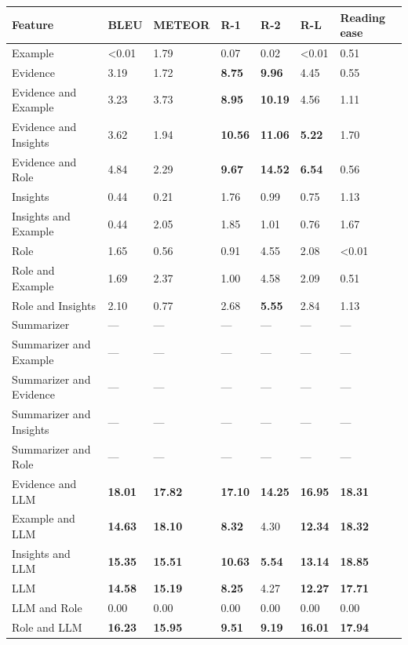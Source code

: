 \begin{tabular}{|l|l|l|l|l|l|l|}
\hline
\textbf{Feature} & BLEU & METEOR & R-1 & R-2 & R-L & Reading ease \\
 \hline
 Example & \textless{}0.01 & 1.79 & 0.07 & 0.02 & \textless{}0.01 & 0.51 \\
 \hline
 Evidence & 3.19 & 1.72 & \textbf{8.75} & \textbf{9.96} & 4.45 & 0.55 \\
 \hline
 Evidence and Example & 3.23 & 3.73 & \textbf{8.95} & \textbf{10.19} & 4.56 & 1.11 \\
 \hline
 Evidence and Insights & 3.62 & 1.94 & \textbf{10.56} & \textbf{11.06} & \textbf{5.22} & 1.70 \\
 \hline
 Evidence and Role & 4.84 & 2.29 & \textbf{9.67} & \textbf{14.52} & \textbf{6.54} & 0.56 \\
 \hline
 Insights & 0.44 & 0.21 & 1.76 & 0.99 & 0.75 & 1.13 \\
 \hline
 Insights and Example & 0.44 & 2.05 & 1.85 & 1.01 & 0.76 & 1.67 \\
 \hline
 Role & 1.65 & 0.56 & 0.91 & 4.55 & 2.08 & \textless{}0.01 \\
 \hline
 Role and Example & 1.69 & 2.37 & 1.00 & 4.58 & 2.09 & 0.51 \\
 \hline
 Role and Insights & 2.10 & 0.77 & 2.68 & \textbf{5.55} & 2.84 & 1.13 \\
 \hline
 Summarizer & — & — & — & — & — & — \\
 \hline
 Summarizer and Example & — & — & — & — & — & — \\
 \hline
 Summarizer and Evidence & — & — & — & — & — & — \\
 \hline
 Summarizer and Insights & — & — & — & — & — & — \\
 \hline
 Summarizer and Role & — & — & — & — & — & — \\
 \hline
 Evidence and LLM & \textbf{18.01} & \textbf{17.82} & \textbf{17.10} & \textbf{14.25} & \textbf{16.95} & \textbf{18.31} \\
 \hline
 Example and LLM & \textbf{14.63} & \textbf{18.10} & \textbf{8.32} & 4.30 & \textbf{12.34} & \textbf{18.32} \\
 \hline
 Insights and LLM & \textbf{15.35} & \textbf{15.51} & \textbf{10.63} & \textbf{5.54} & \textbf{13.14} & \textbf{18.85} \\
 \hline
 LLM & \textbf{14.58} & \textbf{15.19} & \textbf{8.25} & 4.27 & \textbf{12.27} & \textbf{17.71} \\
 \hline
 LLM and Role & 0.00 & 0.00 & 0.00 & 0.00 & 0.00 & 0.00 \\
 \hline
 Role and LLM & \textbf{16.23} & \textbf{15.95} & \textbf{9.51} & \textbf{9.19} & \textbf{16.01} & \textbf{17.94} \\
\hline
\end{tabular}

